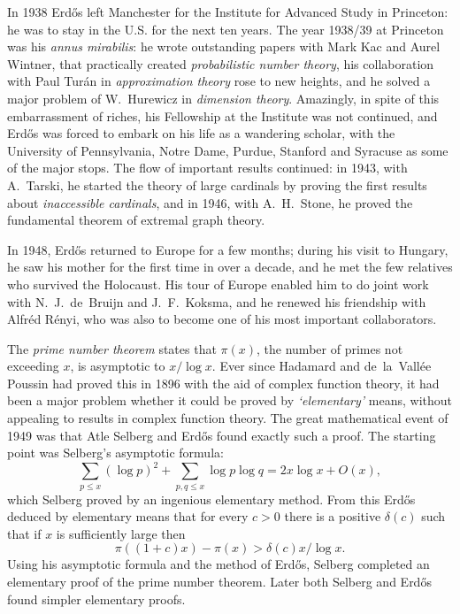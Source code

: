 \documentclass[a6paper]{article}
\begin{document}
In 1938 Erd\H{o}s left Manchester for the Institute for Advanced Study
in Princeton:  he was to stay in the U.S. for the next ten years.
The year 1938/39 at Princeton was his {\it annus
mirabilis\/}:  he wrote outstanding papers with Mark Kac
and Aurel Wintner, that practically created {\it probabilistic number
theory}, his collaboration with Paul Tur\'an in {\it approximation
theory\/} rose to new heights, and he solved a major problem of
W.~Hurewicz in {\it dimension theory}.  Amazingly, in spite of this
embarrassment of riches, his Fellowship at the Institute was not continued,
and Erd\H{o}s was forced to embark on his life as a wandering scholar, with
the University of Pennsylvania, Notre Dame, Purdue, Stanford and Syracuse 
as some of the major stops. The flow of important results continued: in 1943, 
with A.~Tarski, he started the theory of large cardinals by proving the 
first results about {\it inaccessible cardinals}, and in 1946, with 
A.~H.~Stone, he proved the fundamental theorem of extremal graph theory.


In 1948, Erd\H{o}s returned to Europe for a few months; during his visit 
to Hungary, he saw his mother for the first time in over a decade, and 
he met the few relatives who survived the Holocaust. His tour of Europe 
enabled him to do joint work with N.~J.~de~Bruijn and J.~F.~Koksma, 
and he renewed his
friendship with Alfr\'ed R\'enyi, who was also to become one of his most
important collaborators.

The {\it prime number theorem} states that $\pi (x)$, the number of primes not
exceeding $x$, is asymptotic to $x/\log x$. Ever since Hadamard and 
de~la~Vall\'ee Poussin had proved this in 1896 with the aid of 
complex function theory, it had been a major 
problem whether it could be proved by {\it `elementary'} means, without
appealing to results in complex function theory. The great mathematical 
event of 1949 was that Atle Selberg and Erd\H{o}s found exactly such a proof.
The starting point was Selberg's asymptotic formula:
$$\sum_{p\le x} (\log p)^2 + \sum_{p,q\le x}\log p \log q =2x\log x+O(x),$$
which Selberg proved by an ingenious elementary method. From this 
Erd\H{o}s deduced by elementary means that for every $c>0$ there 
is a positive $\delta (c)$ such
that if $x$ is sufficiently large then
$$\pi ((1+c)x)-\pi (x) > \delta (c) x/\log x.$$
Using his asymptotic formula and the method of Erd\H{o}s, Selberg completed an
elementary proof of the prime number theorem. Later both Selberg and Erd\H{o}s
found simpler elementary proofs.
\end{document}
